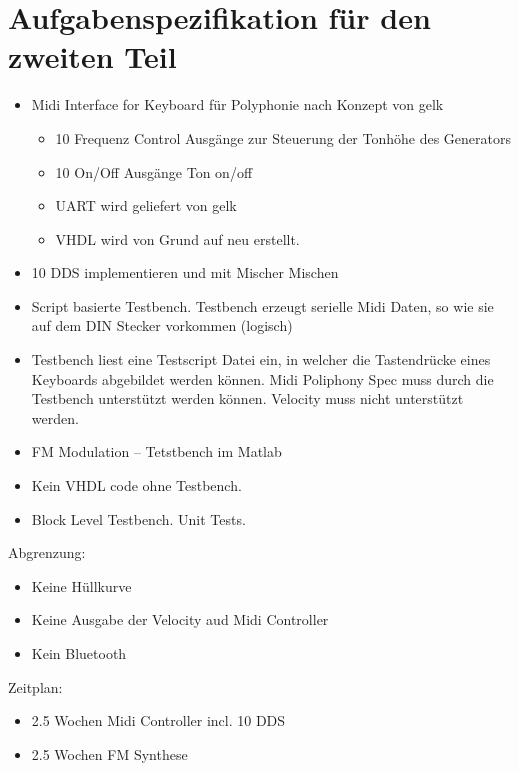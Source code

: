 \chapter{Aufgabenspezifikation für den zweiten Teil}\label{chap.anhang_aufgabenstellung_neu}

\begin{itemize}
\item Midi Interface for Keyboard für Polyphonie nach Konzept von gelk
\begin{itemize}
    \item 10 Frequenz Control Ausgänge zur Steuerung der Tonhöhe des Generators\\
    \item 10 On/Off Ausgänge Ton on/off\\
    \item UART wird geliefert von gelk\\
    \item VHDL wird von Grund auf neu erstellt.
\end{itemize}
\item 10 DDS implementieren und mit Mischer Mischen
\item Script basierte Testbench. Testbench erzeugt serielle Midi Daten, so wie sie auf dem DIN Stecker vorkommen (logisch)
\item Testbench liest eine Testscript Datei ein, in welcher die Tastendrücke eines Keyboards abgebildet werden können. Midi Poliphony Spec muss durch die Testbench unterstützt werden können. Velocity muss nicht unterstützt werden.
\item FM Modulation – Tetstbench im Matlab
\item Kein VHDL code ohne Testbench.
\item Block Level Testbench. Unit Tests.
\end{itemize}  

Abgrenzung:

\begin{itemize}
\item Keine Hüllkurve
\item Keine Ausgabe der Velocity aud Midi Controller
\item Kein Bluetooth
\end{itemize} 

Zeitplan:

\begin{itemize}
\item 2.5 Wochen Midi Controller incl. 10 DDS
\item 2.5 Wochen FM Synthese 
\end{itemize} 


